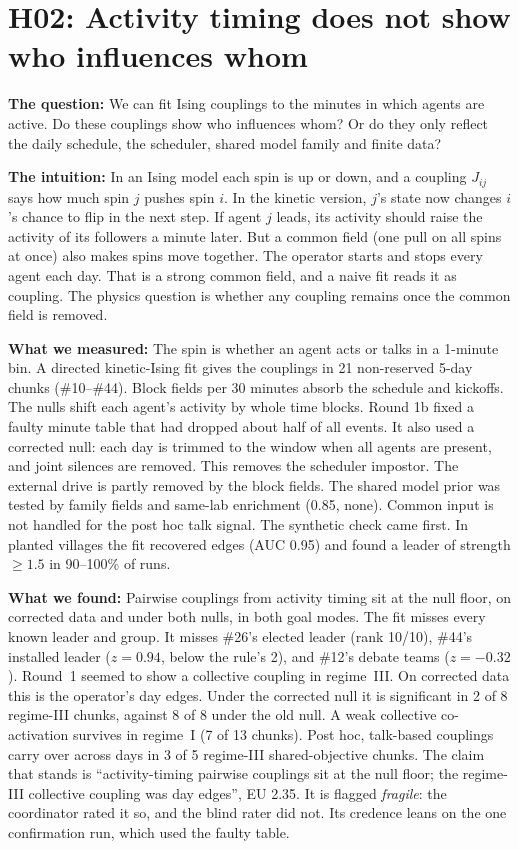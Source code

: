 \section{H02: Activity timing does not show who influences whom}

\textbf{The question:} We can fit Ising couplings to the minutes in which agents are active. Do these couplings show who influences whom? Or do they only reflect the daily schedule, the scheduler, shared model family and finite data?

\textbf{The intuition:} In an Ising model each spin is up or down, and a coupling $J_{ij}$ says how much spin $j$ pushes spin $i$. In the kinetic version, $j$'s state now changes $i$'s chance to flip in the next step. If agent $j$ leads, its activity should raise the activity of its followers a minute later. But a common field (one pull on all spins at once) also makes spins move together. The operator starts and stops every agent each day. That is a strong common field, and a naive fit reads it as coupling. The physics question is whether any coupling remains once the common field is removed.

\textbf{What we measured:} The spin is whether an agent acts or talks in a 1-minute bin. A directed kinetic-Ising fit gives the couplings in 21 non-reserved 5-day chunks (\#10--\#44). Block fields per 30 minutes absorb the schedule and kickoffs. The nulls shift each agent's activity by whole time blocks. Round 1b fixed a faulty minute table that had dropped about half of all events. It also used a corrected null: each day is trimmed to the window when all agents are present, and joint silences are removed. This removes the scheduler impostor. The external drive is partly removed by the block fields. The shared model prior was tested by family fields and same-lab enrichment (0.85, none). Common input is not handled for the post hoc talk signal. The synthetic check came first. In planted villages the fit recovered edges (AUC 0.95) and found a leader of strength $\ge1.5$ in 90--100\% of runs.

\textbf{What we found:} Pairwise couplings from activity timing sit at the null floor, on corrected data and under both nulls, in both goal modes. The fit misses every known leader and group. It misses \#26's elected leader (rank 10/10), \#44's installed leader ($z=0.94$, below the rule's 2), and \#12's debate teams ($z=-0.32$). Round~1 seemed to show a collective coupling in regime~III. On corrected data this is the operator's day edges. Under the corrected null it is significant in 2 of 8 regime-III chunks, against 8 of 8 under the old null. A weak collective co-activation survives in regime~I (7 of 13 chunks). Post hoc, talk-based couplings carry over across days in 3 of 5 regime-III shared-objective chunks. The claim that stands is ``activity-timing pairwise couplings sit at the null floor; the regime-III collective coupling was day edges'', EU 2.35. It is flagged \emph{fragile}: the coordinator rated it so, and the blind rater did not. Its credence leans on the one confirmation run, which used the faulty table.

